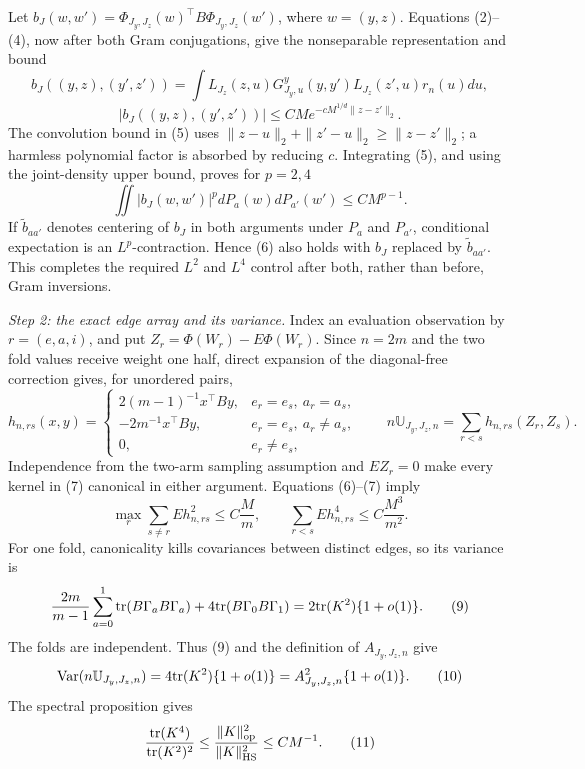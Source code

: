Let \(b_J(w,w')=\Phi_{J_y,J_z}(w)^\top B\Phi_{J_y,J_z}(w')\), where \(w=(y,z)\).  Equations (2)--(4), now after both Gram conjugations, give the nonseparable representation and bound
\[
b_J((y,z),(y',z'))
=\int L_{J_z}(z,u)G^y_{J_y,u}(y,y')L_{J_z}(z',u)r_n(u)du,
\]
\[
|b_J((y,z),(y',z'))|
\le CM e^{-cM^{1/d}\|z-z'\|_2}.                              \tag{5}
\]
The convolution bound in (5) uses
\(\|z-u\|_2+\|z'-u\|_2\ge\|z-z'\|_2\); a harmless polynomial factor is absorbed by reducing \(c\).  Integrating (5), and using the joint-density upper bound, proves for \(p=2,4\)
\[
\iint |b_J(w,w')|^p dP_a(w)dP_{a'}(w')\le C M^{p-1}.          \tag{6}
\]
If \(\widetilde b_{aa'}\) denotes centering of \(b_J\) in both arguments under \(P_a\) and \(P_{a'}\), conditional expectation is an \(L^p\)-contraction.  Hence (6) also holds with \(b_J\) replaced by \(\widetilde b_{aa'}\).  This completes the required \(L^2\) and \(L^4\) control after both, rather than before, Gram inversions.

\emph{Step 2: the exact edge array and its variance.}
Index an evaluation observation by \(r=(e,a,i)\), and put \(Z_r=\Phi(W_r)-E\Phi(W_r)\).  Since \(n=2m\) and the two fold values receive weight one half, direct expansion of the diagonal-free correction gives, for unordered pairs,
\[
h_{n,rs}(x,y)=
\begin{cases}
2(m-1)^{-1}x^\top By,&e_r=e_s,\ a_r=a_s,\\
-2m^{-1}x^\top By,&e_r=e_s,\ a_r\ne a_s,\\
0,&e_r\ne e_s,
\end{cases}
\qquad
n\mathbb U_{J_y,J_z,n}=\sum_{r<s}h_{n,rs}(Z_r,Z_s).          \tag{7}
\]
Independence from the two-arm sampling assumption and \(EZ_r=0\) make every kernel in (7) canonical in either argument.  Equations (6)--(7) imply
\[
\max_r\sum_{s\ne r}Eh_{n,rs}^2\le C\frac{M}{m},
\qquad
\sum_{r<s}Eh_{n,rs}^4\le C\frac{M^3}{m^2}.                   \tag{8}
\]
For one fold, canonicality kills covariances between distinct edges, so its variance is
\[
\frac{2m}{m-1}\sum_{a=0}^1
{\rm tr}(B\Gamma_aB\Gamma_a)
+4{\rm tr}(B\Gamma_0B\Gamma_1)
=2{\rm tr}(K^2)\{1+o(1)\}.                                  \tag{9}
\]
The folds are independent.  Thus (9) and the definition of \(A_{J_y,J_z,n}\) give
\[
{\rm Var}(n\mathbb U_{J_y,J_z,n})
=4{\rm tr}(K^2)\{1+o(1)\}=A_{J_y,J_z,n}^2\{1+o(1)\}.        \tag{10}
\]
The spectral proposition gives
\[
\frac{{\rm tr}(K^4)}{{\rm tr}(K^2)^2}
\le\frac{\|K\|_{\rm op}^2}{\|K\|_{\rm HS}^2}
\le CM^{-1}.                                                  \tag{11}
\]

